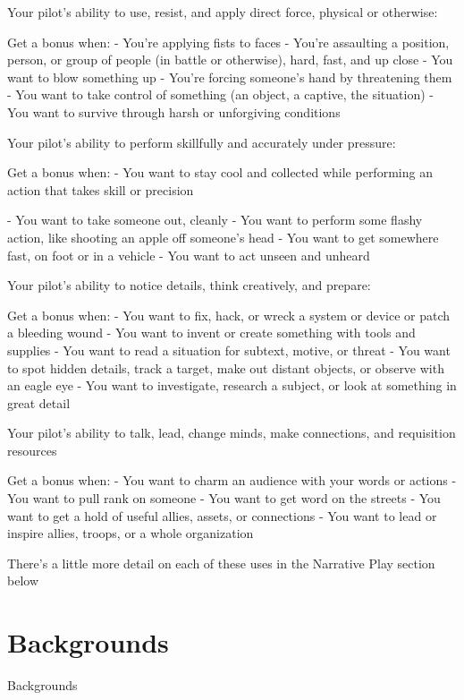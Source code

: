 Your pilot’s ability to use, resist, and apply direct force, physical or otherwise:

Get a bonus when:
          - You’re applying fists to faces
          - You’re assaulting a position, person, or group of people (in battle or otherwise), hard,
         fast, and up close
          - You want to blow something up
          - You’re forcing someone’s hand by threatening them
          - You want to take control of something (an object, a captive, the situation)
          - You want to survive through harsh or unforgiving conditions

Your pilot’s ability to perform skillfully and accurately under pressure:

Get a bonus when:
         - You want to stay cool and collected while performing an action that takes skill or
         precision




         - You want to take someone out, cleanly
         - You want to perform some flashy action, like shooting an apple off someone’s head
         - You want to get somewhere fast, on foot or in a vehicle
         - You want to act unseen and unheard

Your pilot’s ability to notice details, think creatively, and prepare:

Get a bonus when:
         - You want to fix, hack, or wreck a system or device or patch a bleeding wound
         - You want to invent or create something with tools and supplies
         - You want to read a situation for subtext, motive, or threat
         - You want to spot hidden details, track a target, make out distant objects, or observe with
         an eagle eye
         - You want to investigate, research a subject, or look at something in great detail

Your pilot’s ability to talk, lead, change minds, make connections, and requisition
resources

Get a bonus when:
         - You want to charm an audience with your words or actions
         - You want to pull rank on someone
         - You want to get word on the streets
         - You want to get a hold of useful allies, assets, or connections
         - You want to lead or inspire allies, troops, or a whole organization

There’s a little more detail on each of these uses in the Narrative Play section below

\chapter{Backgrounds}
                                               Backgrounds

